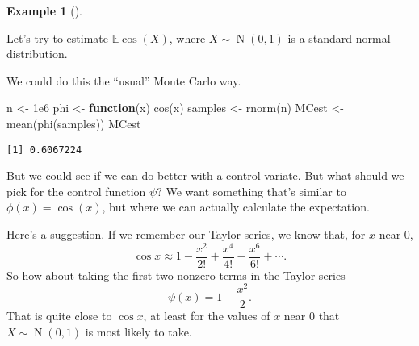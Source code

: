 \documentclass[
  letterpaper,
  DIV=11,
  numbers=noendperiod]{scrreprt}
\newenvironment{Shaded}{\begin{snugshade}}{\end{snugshade}}
\newcommand{\ControlFlowTok}[1]{\textcolor[rgb]{0.00,0.23,0.31}{\textbf{#1}}}
\newcommand{\FloatTok}[1]{\textcolor[rgb]{0.68,0.00,0.00}{#1}}
\newcommand{\FunctionTok}[1]{\textcolor[rgb]{0.28,0.35,0.67}{#1}}
\newcommand{\NormalTok}[1]{\textcolor[rgb]{0.00,0.23,0.31}{#1}}
\newcommand{\OtherTok}[1]{\textcolor[rgb]{0.00,0.23,0.31}{#1}}
\newcommand{\Ex}{\mathbb{E}}
\theoremstyle{plain}
\theoremstyle{definition}
\theoremstyle{definition}
\newtheorem{example}{Example}[chapter]
\theoremstyle{remark}
\begin{document}
\begin{example}[]\protect\hypertarget{exm-control}{}\label{exm-control}

Let's try to estimate \(\Ex \cos(X)\), where
\(X \sim \operatorname{N}(0,1)\) is a standard normal distribution.

We could do this the ``usual'' Monte Carlo way.

\begin{Shaded}
\begin{Highlighting}[]
\NormalTok{n }\OtherTok{\textless{}{-}} \FloatTok{1e6}
\NormalTok{phi }\OtherTok{\textless{}{-}} \ControlFlowTok{function}\NormalTok{(x) }\FunctionTok{cos}\NormalTok{(x)}
\NormalTok{samples }\OtherTok{\textless{}{-}} \FunctionTok{rnorm}\NormalTok{(n)}
\NormalTok{MCest }\OtherTok{\textless{}{-}} \FunctionTok{mean}\NormalTok{(}\FunctionTok{phi}\NormalTok{(samples))}
\NormalTok{MCest}
\end{Highlighting}
\end{Shaded}

\begin{verbatim}
[1] 0.6067224
\end{verbatim}

But we could see if we can do better with a control variate. But what
should we pick for the control function \(\psi\)? We want something
that's similar to \(\phi(x) = \cos(x)\), but where we can actually
calculate the expectation.

Here's a suggestion. If we remember our
\href{https://en.wikipedia.org/wiki/Taylor_series}{Taylor series}, we
know that, for \(x\) near \(0\),
\[ \cos x \approx 1 - \frac{x^2}{2!} + \frac{x^4}{4!} - \frac{x^6}{6!} + \cdots . \]
So how about taking the first two nonzero terms in the Taylor series
\[ \psi(x) = 1 - \frac{x^2}{2} . \] That is quite close to \(\cos x\),
at least for the values of \(x\) near 0 that
\(X \sim \operatorname{N}(0,1)\) is most likely to take.


\end{example}
\end{document}
